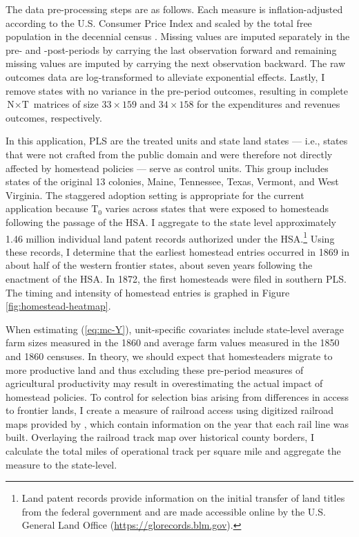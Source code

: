 The data pre-processing steps are as follows. Each measure is inflation-adjusted according to the U.S. Consumer Price Index \citep{williamson2017seven} and scaled by the total free population in the decennial census \citep{haines2010}. Missing values are imputed separately in the pre- and -post-periods by carrying the last observation forward and remaining missing values are imputed by carrying the next observation backward. The raw outcomes data are log-transformed to alleviate exponential effects. Lastly, I remove states with no variance in the pre-period outcomes, resulting in complete $\text{N} \times \text{T}$ matrices of size $33 \times 159$ and $34 \times 158$ for the expenditures and revenues outcomes, respectively. 

In this application, PLS are the treated units and state land states --- i.e., states that were not crafted from the public domain and were therefore not directly affected by homestead policies --- serve as control units. This group includes states of the original 13 colonies, Maine, Tennessee, Texas, Vermont, and West Virginia. The staggered adoption setting is appropriate for the current application because $\text{T}_0$ varies across states that were exposed to homesteads following the passage of the HSA. I aggregate to the state level approximately 1.46 million individual land patent records authorized under the HSA.\footnote{Land patent records provide information on the initial transfer of land titles from the federal government and are made accessible online by the U.S. General Land Office (\url{https://glorecords.blm.gov}).} Using these records, I determine that the earliest homestead entries occurred in 1869 in about half of the western frontier states, about seven years following the enactment of the HSA. In 1872, the first homesteads were filed in southern PLS. The timing and intensity of homestead entries is graphed in Figure \ref{fig:homestead-heatmap}. 

When estimating (\ref{eq:mc-Y}), unit-specific covariates include state-level average farm sizes measured in the 1860 and average farm values measured in the 1850 and 1860 censuses. In theory, we should expect that homesteaders migrate to more productive land and thus excluding these pre-period measures of agricultural productivity may result in overestimating the actual impact of homestead policies. To control for selection bias arising from differences in access to frontier lands, I create a measure of railroad access using digitized railroad maps provided by \citet{atack2013use}, which contain information on the year that each rail line was built. Overlaying the railroad track map over historical county borders, I calculate the total miles of operational track per square mile and aggregate the measure to the state-level.

